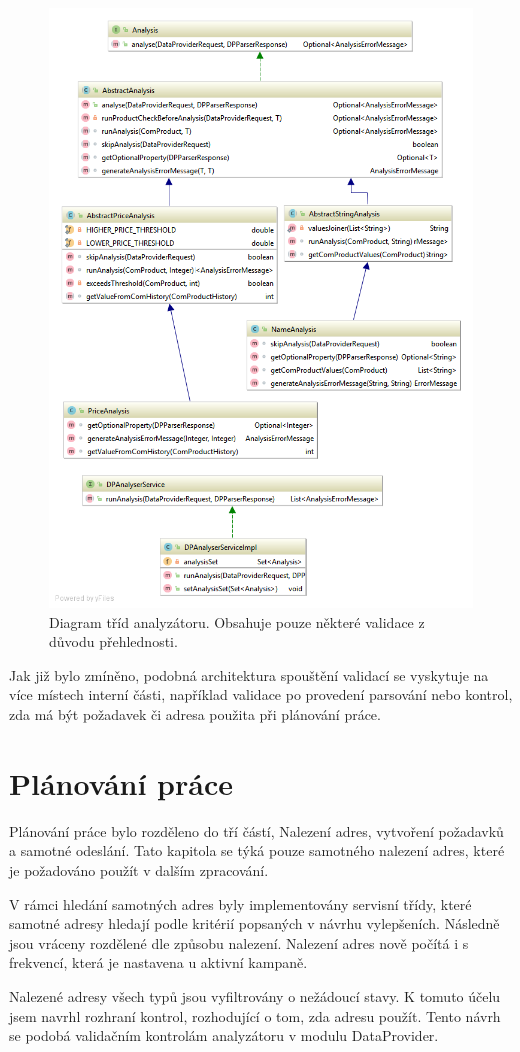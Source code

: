\documentclass[thesis=B,czech]{FITthesis}[2012/06/26]
\begin{document}
\begin{figure}\centering
 	\includegraphics[width=1.0\textwidth]{resources/analyser-classes}
	\caption[Diagram tříd analyzátoru]{Diagram tříd analyzátoru. Obsahuje pouze některé validace z důvodu přehlednosti.}\label{fig:analyser-classes}
\end{figure}


Jak již bylo zmíněno, podobná architektura spouštění validací se vyskytuje na více místech interní části, například validace po provedení
parsování nebo kontrol, zda má být požadavek či adresa použita při plánování práce.


\section{Plánování práce}\label{ch:planning}
Plánování práce bylo rozděleno do tří částí, Nalezení adres, vytvoření požadavků a samotné odeslání.
Tato kapitola se týká pouze samotného nalezení adres, které je požadováno použít v dalším zpracování.
\par
V rámci hledání samotných adres byly implementovány servisní třídy, které samotné adresy hledají podle kritérií popsaných v 
návrhu vylepšeních. Následně jsou vráceny rozdělené dle způsobu nalezení. Nalezení adres nově počítá i s frekvencí, 
která je nastavena u aktivní kampaně.
\par
Nalezené adresy všech typů jsou vyfiltrovány o nežádoucí stavy. K tomuto účelu jsem navrhl rozhraní kontrol, rozhodující 
o tom, zda adresu použít. Tento návrh se podobá validačním kontrolám analyzátoru v modulu DataProvider.
\end{document}
